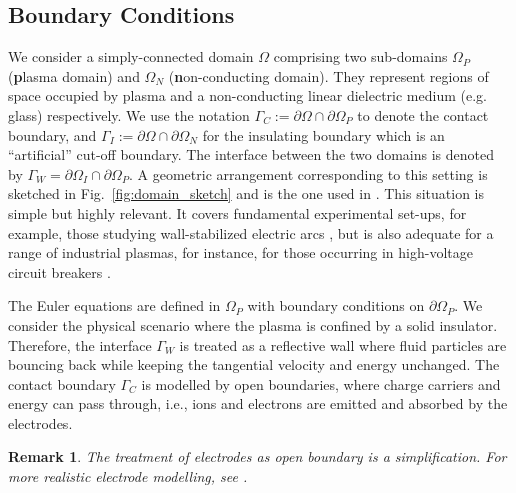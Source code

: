 \documentclass{article}
\newtheorem*{remark}{Remark}
\begin{document}
\subsection{Boundary Conditions} \label{sec:BC}

We consider a simply-connected domain $\Omega$ comprising two sub-domains $\Omega_P$
(\textbf{p}lasma domain) and $\Omega_N$ (\textbf{n}on-conducting domain). They represent
regions of space occupied by plasma and a non-conducting linear dielectric medium
(e.g. glass) respectively. We use the notation
$\Gamma_C := \partial\Omega \cap \partial\Omega_P$ to denote the contact boundary, and
$\Gamma_I := \partial\Omega \cap \partial\Omega_N$ for the insulating boundary which is an
``artificial'' cut-off boundary. The interface between the two domains is denoted by
$\Gamma_W = \partial\Omega_I \cap \partial\Omega_P$. A geometric arrangement corresponding
to this setting is sketched in Fig.~\ref{fig:domain_sketch} and is the one used in
\cite[][Chapt.~1, Sec.~4]{fuchs_2021}. This situation is simple but highly relevant. It
covers fundamental experimental set-ups, for example, those studying wall-stabilized
electric arcs \cite{GGF05}, but is also adequate for a range of industrial plasmas, for
instance, for those occurring in high-voltage circuit breakers \cite{SEE15,MGU20}.

The Euler equations are defined in $\Omega_P$ with boundary conditions on
$\partial\Omega_P$. We consider the physical scenario where the plasma is confined by a
solid insulator. Therefore, the interface $\Gamma_W$ is treated as a reflective wall where
fluid particles are bouncing back while keeping the tangential velocity and energy
unchanged. The contact boundary $\Gamma_C$ is modelled by open boundaries, where charge
carriers and energy can pass through, i.e., ions and electrons are emitted and absorbed by
the electrodes.

\begin{remark}
  The treatment of electrodes as open boundary is a simplification. For more realistic
  electrode modelling, see \cite{godyak_1990, parker_1993}.
\end{remark}
\end{document}
